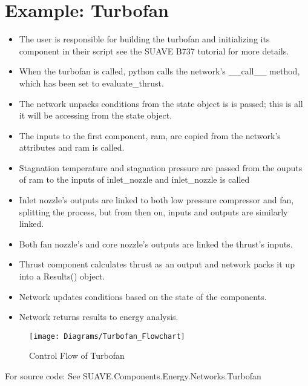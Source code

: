\documentclass[11pt]{article} %
\begin{document}
\section{Example: Turbofan}
\begin{itemize}
\item The user is responsible for building the turbofan and initializing its component in their script see the SUAVE B737 tutorial for more details.
\item When the turbofan is called, python calls the network's \_\_call\_\_ method, which has been set to evaluate\_thrust.  
\item The network unpacks conditions from the state object is is passed; this is all it will be accessing from the state object. 
\item The inputs to the first component, ram, are copied from the network's attributes and ram is called.
\item Stagnation temperature and stagnation pressure are passed from the ouputs of ram to the inputs of inlet\_nozzle and inlet\_nozzle is called
\item Inlet nozzle's outputs are linked to both low pressure compressor and fan, splitting the process, but from then on, inputs and outputs are similarly linked.
\item Both fan nozzle's and core nozzle's outputs are linked the thrust's inputs.
\item Thrust component calculates thrust as an output and network packs it up into a Results() object.
\item Network updates conditions based on the state of the components.
\item Network returns results to energy analysis.
\end{itemize}
\begin{figure}
\texttt{[image: Diagrams/Turbofan\_Flowchart]}
\caption{Control Flow of Turbofan}
\end{figure}

For source code: See SUAVE.Components.Energy.Networks.Turbofan
%
\end{document}
